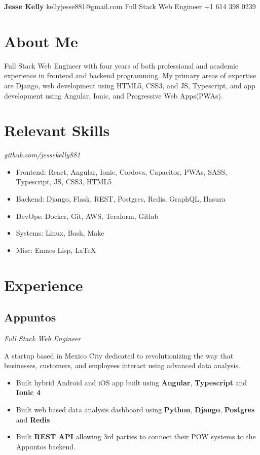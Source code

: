 \documentclass[letterpaper,11pt]{article}
\begin{document}
\begin{flushleft}
\Large{\textbf{Jesse Kelly}}
\hfill
kellyjesse881@gmail.com
\newline
Full Stack Web Engineer
\hfill
+1 614 398 0239
\end{flushleft}

\section{About Me}
Full Stack Web Engineer with four years of both
professional and academic experience in frontend
and backend programming. My primary areas of
expertise are Django, web development using HTML5,
CSS3, and JS, Typescript, and app development using
Angular, Ionic, and Progressive Web Apps(PWAs).

\section{Relevant Skills}
\textit{github.com/jessekelly881}
\begin{itemize}
\setlength\itemsep{0em}
\item Frontend: React, Angular, Ionic, Cordova, Capacitor, PWAs, SASS, Typescript, JS, CSS3, HTML5
\item Backend: Django, Flask, REST, Postgres, Redis, GraphQL, Hasura
\item DevOps: Docker, Git, AWS, Teraform, Gitlab
\item Systems: Linux, Bash, Make
\item Misc: Emacs Lisp, \LaTeX
\end{itemize}

\section{Experience}
\subsection{Appuntos}
\textit{Full Stack Web Engineer}
\vspace{2mm}
\begin{adjustwidth}{1cm}{1cm}
  A startup based in Mexico City dedicated to revolutionizing the way that businesses, customers,
  and employees interact using advanced data analysis.

\begin{itemize}
\item Built hybrid Android and iOS app built using \textbf{Angular}, \textbf{Typescript} and \textbf{Ionic 4}
\item Built web based data analysis dashboard using \textbf{Python}, \textbf{Django}, \textbf{Postgres} and \textbf{Redis}
\item Built \textbf{REST API} allowing 3rd parties to connect their POW systems to the Appuntos backend.
\end{itemize}

\end{adjustwidth}
\end{document}
